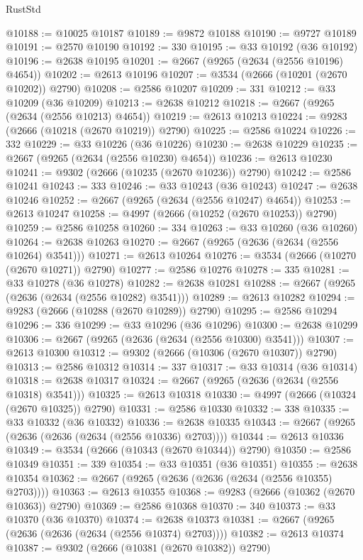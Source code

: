 \begin{lexlean}{RustStd}
\begin{coremodule}
@10188 := @10025 @10187
@10189 := @9872 @10188
@10190 := @9727 @10189
@10191 := @2570 @10190
@10192 := 330
@10195 := @33 @10192 (@36 @10192)
@10196 := @2638 @10195
@10201 := @2667 (@9265 (@2634 (@2556 @10196) @4654))
@10202 := @2613 @10196
@10207 := @3534 (@2666 (@10201 (@2670 @10202)) @2790)
@10208 := @2586 @10207
@10209 := 331
@10212 := @33 @10209 (@36 @10209)
@10213 := @2638 @10212
@10218 := @2667 (@9265 (@2634 (@2556 @10213) @4654))
@10219 := @2613 @10213
@10224 := @9283 (@2666 (@10218 (@2670 @10219)) @2790)
@10225 := @2586 @10224
@10226 := 332
@10229 := @33 @10226 (@36 @10226)
@10230 := @2638 @10229
@10235 := @2667 (@9265 (@2634 (@2556 @10230) @4654))
@10236 := @2613 @10230
@10241 := @9302 (@2666 (@10235 (@2670 @10236)) @2790)
@10242 := @2586 @10241
@10243 := 333
@10246 := @33 @10243 (@36 @10243)
@10247 := @2638 @10246
@10252 := @2667 (@9265 (@2634 (@2556 @10247) @4654))
@10253 := @2613 @10247
@10258 := @4997 (@2666 (@10252 (@2670 @10253)) @2790)
@10259 := @2586 @10258
@10260 := 334
@10263 := @33 @10260 (@36 @10260)
@10264 := @2638 @10263
@10270 := @2667 (@9265 (@2636 (@2634 (@2556 @10264) @3541)))
@10271 := @2613 @10264
@10276 := @3534 (@2666 (@10270 (@2670 @10271)) @2790)
@10277 := @2586 @10276
@10278 := 335
@10281 := @33 @10278 (@36 @10278)
@10282 := @2638 @10281
@10288 := @2667 (@9265 (@2636 (@2634 (@2556 @10282) @3541)))
@10289 := @2613 @10282
@10294 := @9283 (@2666 (@10288 (@2670 @10289)) @2790)
@10295 := @2586 @10294
@10296 := 336
@10299 := @33 @10296 (@36 @10296)
@10300 := @2638 @10299
@10306 := @2667 (@9265 (@2636 (@2634 (@2556 @10300) @3541)))
@10307 := @2613 @10300
@10312 := @9302 (@2666 (@10306 (@2670 @10307)) @2790)
@10313 := @2586 @10312
@10314 := 337
@10317 := @33 @10314 (@36 @10314)
@10318 := @2638 @10317
@10324 := @2667 (@9265 (@2636 (@2634 (@2556 @10318) @3541)))
@10325 := @2613 @10318
@10330 := @4997 (@2666 (@10324 (@2670 @10325)) @2790)
@10331 := @2586 @10330
@10332 := 338
@10335 := @33 @10332 (@36 @10332)
@10336 := @2638 @10335
@10343 := @2667 (@9265 (@2636 (@2636 (@2634 (@2556 @10336) @2703))))
@10344 := @2613 @10336
@10349 := @3534 (@2666 (@10343 (@2670 @10344)) @2790)
@10350 := @2586 @10349
@10351 := 339
@10354 := @33 @10351 (@36 @10351)
@10355 := @2638 @10354
@10362 := @2667 (@9265 (@2636 (@2636 (@2634 (@2556 @10355) @2703))))
@10363 := @2613 @10355
@10368 := @9283 (@2666 (@10362 (@2670 @10363)) @2790)
@10369 := @2586 @10368
@10370 := 340
@10373 := @33 @10370 (@36 @10370)
@10374 := @2638 @10373
@10381 := @2667 (@9265 (@2636 (@2636 (@2634 (@2556 @10374) @2703))))
@10382 := @2613 @10374
@10387 := @9302 (@2666 (@10381 (@2670 @10382)) @2790)

\end{coremodule}
\end{lexlean}
